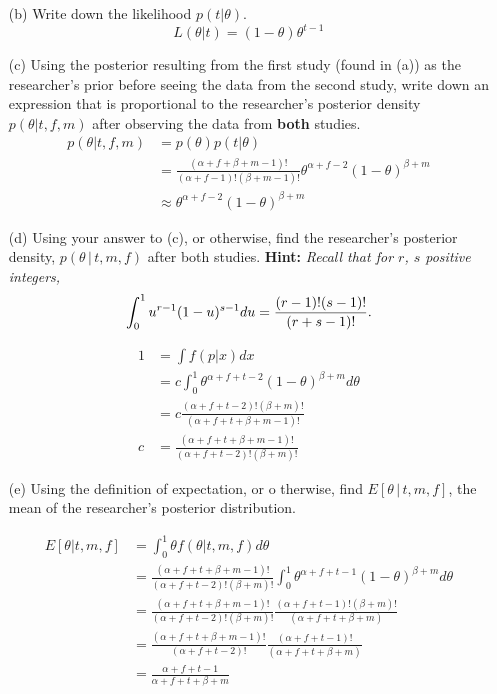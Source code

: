 \documentclass{article}
\newcommand{\1}{\mathbf{1}}
\begin{document}
\begin{enumerate}
    \item[(b)] Write down the likelihood $p(t | \theta)$.
    $$L(\theta | t) = (1-\theta)\theta^{t-1}$$

    \item[(c)] Using the posterior  resulting from the first study (found in (a)) as the researcher's prior  before seeing the data from the second study, write down an expression that is proportional to the researcher's posterior density $p(\theta | t, f,m)$ after observing the data from {\bf both} studies.
    \begin{align*}
        p(\theta | t, f, m) &= p(\theta) p(t|\theta) \\
        &= \frac{(\alpha+f+\beta + m -1)!}{(\alpha + f -1)!(\beta + m -1)!}\theta^{\alpha + f - 2}(1-\theta)^{\beta + m} \\
        &\approx \theta^{\alpha + f - 2 }(1-\theta)^{\beta + m}
    \end{align*}
    
    \item[(d)] Using your answer to (c), or otherwise, find the researcher's posterior density,  $p(\theta \,|\, t, m,f)$ after both studies.
    {\bf Hint:} {\it  Recall that for $r$, $s$ positive integers,
    $$ \int_0^1 u^{r-1}(1-u)^{s-1}du  = {{(r-1)!(s-1)!}\over {(r+s-1)!}}.  $$}
    
    \begin{align*}
        1 &= \int f(p|x) dx \\
        &= c\int_0^1 \theta^{\alpha+f+t-2}(1-\theta)^{\beta + m}d\theta \\
        &= c \frac{(\alpha + f + t -2)! (\beta+m)!}{(\alpha + f + t + \beta + m -1)!} \\
        c &= \frac{(\alpha + f + t + \beta + m -1)!}{(\alpha + f + t -2)! (\beta+m)!}
    \end{align*}
    
    \item[(e)] Using the definition of expectation, or o
    therwise, find $E[\theta \,|\, t, m, f]$, the mean of the researcher's posterior distribution.
    
    \begin{align*}
        E[\theta | t, m, f] &= \int_0^1 \theta f(\theta| t, m, f) d\theta \\
        &= \frac{(\alpha + f + t + \beta + m -1)!}{(\alpha + f + t -2)! (\beta+m)!} \int_0^1 \theta^{\alpha + f + t -1}(1-\theta)^{\beta+m} d\theta \\
        &= \frac{(\alpha + f + t + \beta + m -1)!}{(\alpha + f + t -2)! (\beta+m)!}  \frac{(\alpha + f + t -1)!(\beta+m)!}{(\alpha + f + t +\beta + m)} \\
        &= \frac{(\alpha + f + t + \beta + m -1)!}{(\alpha + f + t -2)!}  \frac{(\alpha + f + t -1)!}{(\alpha + f + t +\beta + m)} \\
        &= \frac{\alpha + f + t -1}{\alpha + f + t +\beta + m}
    \end{align*}


\end{enumerate}
\end{document}
